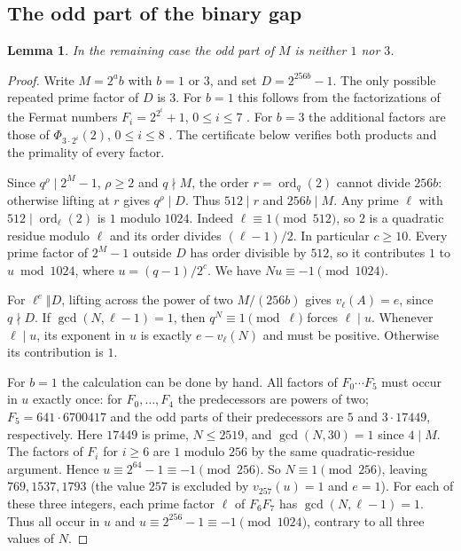 \documentclass[11pt]{article}
\newtheorem{lemma}{Lemma}
\begin{document}
\subsection{The odd part of the binary gap}
\begin{lemma}\label{lem:odd-gap-part}
In the remaining case the odd part of $M$ is neither $1$ nor $3$.
\end{lemma}
\begin{proof}
Write $M=2^a b$ with $b=1$ or $3$, and set $D=2^{256b}-1$.
The only possible repeated prime factor of $D$ is $3$.
For $b=1$ this follows from the factorizations of the Fermat numbers
$F_i=2^{2^i}+1$, $0\le i\le7$ \cite{BrentFermat}.
For $b=3$ the additional factors are those of
$\Phi_{3\cdot2^i}(2)$, $0\le i\le8$ \cite{CunTables}.
The certificate below verifies both products and the primality of every factor.

Since $q^\rho\mid2^M-1$, $\rho\ge2$ and $q\nmid M$, the order
$r=\operatorname{ord}_q(2)$ cannot divide $256b$: otherwise lifting
at $r$ gives $q^\rho\mid D$. Thus $512\mid r$ and $256b\mid M$.
Any prime $\ell$ with $512\mid\operatorname{ord}_\ell(2)$
is $1$ modulo $1024$. Indeed $\ell\equiv1\pmod{512}$, so $2$ is
a quadratic residue modulo $\ell$ and its order divides $(\ell-1)/2$.
In particular $c\ge10$. Every prime factor of $2^M-1$ outside $D$
has order divisible by $512$, so it contributes $1$ to $u\bmod1024$,
where $u=(q-1)/2^c$. We have $Nu\equiv-1\pmod{1024}$.

For $\ell^e\Vert D$, lifting across the power of two $M/(256b)$
gives $v_\ell(A)=e$, since $q\nmid D$.
If $\gcd(N,\ell-1)=1$, then $q^N\equiv1\pmod\ell$ forces $\ell\mid u$.
Whenever $\ell\mid u$, its exponent in $u$ is exactly $e-v_\ell(N)$
and must be positive. Otherwise its contribution is $1$.

For $b=1$ the calculation can be done by hand. All factors of
$F_0\cdots F_5$ must occur in $u$ exactly once: for $F_0,\ldots,F_4$
the predecessors are powers of two; $F_5=641\cdot6700417$ and the
odd parts of their predecessors are $5$ and $3\cdot17449$, respectively.
Here $17449$ is prime, $N\le2519$, and $\gcd(N,30)=1$ since $4\mid M$.
The factors of $F_i$ for $i\ge6$ are $1$ modulo $256$ by the same
quadratic-residue argument. Hence $u\equiv2^{64}-1\equiv-1\pmod{256}$.
So $N\equiv1\pmod{256}$, leaving $769,1537,1793$ (the value
$257$ is excluded by $v_{257}(u)=1$ and $e=1$).
For each of these three integers, each prime factor $\ell$ of
$F_6F_7$ has $\gcd(N,\ell-1)=1$. Thus all occur in $u$ and
$u\equiv2^{256}-1\equiv-1\pmod{1024}$, contrary to all three values of $N$.


\end{proof}
\end{document}
